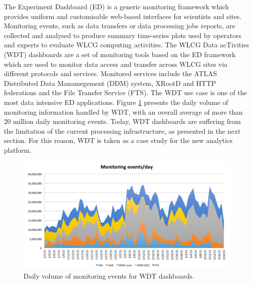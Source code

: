 The Experiment Dashboard (ED) \cite{Andreeva2009} is a generic monitoring
framework which provides uniform and customisable web-based interfaces for
scientists and sites. Monitoring events, such as data transfers or data
processing jobs reports, are collected and analysed to produce summary
time-series plots used by operators and experts to evaluate WLCG computing
activities. The WLCG Data acTivities (WDT) dashboards are a set of monitoring
tools based on the ED framework which are used to monitor data access and
transfer across WLCG sites via different protocols and services. Monitored
services include the ATLAS Distributed Data Manamegement (DDM) system, XRootD
and HTTP federations and the File Transfer Service (FTS).  The WDT use case is
one of the most data intensive ED applications. Figure \ref{fig:wdt} presents
the daily volume of monitoring information handled by WDT, with an overall
average of more than 20 million daily monitoring events.  Today, WDT
dashboards are suffering from the limitation of the current processing
infrastructure, as presented in the next section. For this reason, WDT is taken
as a case study for the new analytics platform.




\begin{figure}
  \centering
  \includegraphics[width=120mm]{./Figures/wdt_volume.pdf}
  \caption{\small Daily volume of monitoring events for WDT dashboards.}\label{fig:wdt}
\end{figure}

